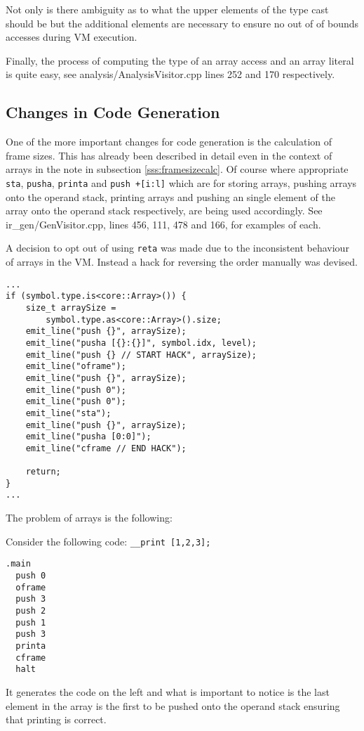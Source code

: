Not only is there ambiguity as to what the upper elements of the
type cast should be but the additional elements are necessary to
ensure no out of of bounds accesses during VM execution.

Finally, the process of computing the type of an array access
and an array literal is quite easy, see
analysis/AnalysisVisitor.cpp lines 252 and 170 respectively.

\subsection{Changes in Code Generation}

One of the more important changes for code generation is the
calculation of frame sizes. This has already been described in
detail even in the context of arrays in the note in subsection
\ref{sss:framesizecalc}. Of course where appropriate
\texttt{sta}, \texttt{pusha}, \texttt{printa} and \texttt{push
+[i:l]} which are for storing arrays, pushing arrays onto the
operand stack, printing arrays and pushing an single element of
the array onto the operand stack respectively, are being used
accordingly. See ir\_gen/GenVisitor.cpp, lines 456, 111, 478 and
166, for examples of each.

A decision to opt out of using \texttt{reta} was made due to the
inconsistent behaviour of arrays in the VM. Instead a hack for
reversing the order manually was devised.

\begin{lstlisting}[caption={A part of the \texttt{visit(Variable
*)} method in the \texttt{GenVisitor} class, specifically the
hack mentioned above (ir\_gen/GenVisitor.cpp)},label=lst:hack]
...
if (symbol.type.is<core::Array>()) {
    size_t arraySize =
        symbol.type.as<core::Array>().size;
    emit_line("push {}", arraySize);
    emit_line("pusha [{}:{}]", symbol.idx, level);
    emit_line("push {} // START HACK", arraySize);
    emit_line("oframe");
    emit_line("push {}", arraySize);
    emit_line("push 0");
    emit_line("push 0");
    emit_line("sta");
    emit_line("push {}", arraySize);
    emit_line("pusha [0:0]");
    emit_line("cframe // END HACK");

    return;
}
...
\end{lstlisting}

The problem of arrays is the following:

Consider the following code: \texttt{\_\_print [1,2,3];}

\begin{minipage}[l]{0.2\linewidth}
\begin{lstlisting}[morekeywords={push, printa, oframe, cframe,
halt}]
  .main
  push 0
  oframe
  push 3
  push 2
  push 1
  push 3
  printa
  cframe
  halt
\end{lstlisting}
\end{minipage}
\hfill\begin{minipage}[t][10em][t]{0.7\linewidth}
It generates the code on the left and what is important to
notice is the last element in the array is the first to be
pushed onto the operand stack ensuring that printing is correct.
\end{minipage}

